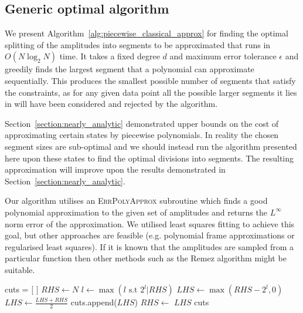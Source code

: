 \documentclass[aps,prx,twocolumn,floatfix,10pt,amssymb,amsfont,amsmath,superscriptaddress,float,nofootinbib,longbibliography,nobalancelastpage]{revtex4-2}
\theoremstyle{empty}
\begin{document}
\subsection{Generic optimal algorithm}
\label{section:algorithm}
We present Algorithm~\ref{alg:piecewise_classical_approx} for finding the optimal splitting of the amplitudes into segments to be approximated that runs in $O(N \log_2 N)$ time. It takes a fixed degree $d$ and maximum error tolerance $\epsilon$ and greedily finds the largest segment that a polynomial can approximate sequentially. This produces the smallest possible number of segments that satisfy the constraints, as for any given data point all the possible larger segments it lies in will have been considered and rejected by the algorithm. 

Section~\ref{section:nearly_analytic} demonstrated upper bounds on the cost of approximating certain states by piecewise polynomials. In reality the chosen segment sizes are sub-optimal and we should instead run the algorithm presented here upon these states to find the optimal divisions into segments. The resulting approximation will improve upon the results demonstrated in Section~\ref{section:nearly_analytic}. 

Our algorithm utilises an \textsc{\footnotesize ErrPolyApprox} subroutine which finds a good polynomial approximation to the given set of amplitudes and returns the $L^\infty$ norm error of the approximation. We utilised least squares fitting to achieve this goal, but other approaches are feasible (e.g. polynomial frame approximations or regularised least squares). If it is known that the amplitudes are sampled from a particular function then other methods such as the Remez algorithm might be suitable.
\begin{algorithm}[H]
\caption{Performs at most $N\log_2 N$ queries to \textsc{\footnotesize ErrPolyApprox} and returns the optimal cuts between the pieces of the polynomial}\label{alg:piecewise_classical_approx}
    \begin{algorithmic}[1]
        \State cuts = [ ]
        \State $RHS \gets N$ 
        \State $l \gets \max (l \text{ s.t } 2^l | RHS)$
        \State $LHS \gets \max (RHS - 2^l,0)$
            \State $LHS \gets \frac{LHS + RHS}{2}$
        \EndWhile
        \State cuts.append($LHS$)
        \State $RHS \gets$ $LHS$
        \EndWhile
        \State \Return cuts
    \end{algorithmic}
\end{algorithm}
\end{document}
